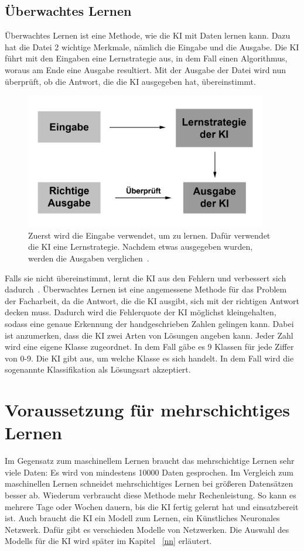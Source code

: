 \documentclass[11pt]{article}
\begin{document}
\subsection{Überwachtes Lernen}
Überwachtes Lernen ist eine Methode, wie die KI mit Daten lernen kann. Dazu hat die Datei 2 wichtige Merkmale, nämlich die Eingabe und die
Ausgabe. Die KI führt mit den Eingaben eine Lernstrategie aus, in dem Fall einen Algorithmus, woraus am Ende eine Ausgabe resultiert. Mit der Ausgabe der Datei wird nun überprüft, ob
die Antwort, die die KI ausgegeben hat, übereinstimmt.
\begin{figure}[h]
    \centering
    \includegraphics[width=300pt, keepaspectratio]{images/slearning}
    \caption[Ablauf eines überwachtes Lernen~\cite{7}]{Zuerst wird die Eingabe verwendet, um zu lernen. Dafür verwendet die KI eine Lernstrategie. Nachdem etwas
    ausgegeben wurden, werden die Ausgaben verglichen~\cite{7}.}
\end{figure}
Falls sie nicht übereinstimmt, lernt die KI aus den Fehlern und verbessert sich
dadurch~\cite{7}. Überwachtes Lernen ist eine angemessene Methode für das Problem der Facharbeit, da die Antwort, die die KI ausgibt, sich mit der richtigen Antwort decken muss.
Dadurch wird die Fehlerquote der KI möglichst kleingehalten, sodass eine genaue Erkennung der handgeschrieben Zahlen gelingen kann.
Dabei ist anzumerken, dass die KI zwei Arten von Lösungen angeben kann.
Jeder Zahl wird eine eigene Klasse zugeordnet. In dem Fall gäbe es 9 Klassen für jede Ziffer von 0-9.
Die KI gibt aus, um welche Klasse es sich handelt.
In dem Fall wird die sogenannte Klassifikation als Lösungsart akzeptiert.

\section{Voraussetzung für mehrschichtiges Lernen}
Im Gegensatz zum maschinellem Lernen braucht das mehrschichtige Lernen sehr viele Daten: Es wird von mindestens 10000 Daten gesprochen.
Im Vergleich zum maschinellen Lernen schneidet mehrschichtiges Lernen bei größeren Datensätzen besser ab. Wiederum verbraucht diese Methode mehr
Rechenleistung. So kann es mehrere Tage oder Wochen dauern, bis die KI fertig gelernt hat und einsatzbereit ist. Auch braucht die KI ein Modell zum
Lernen, ein Künstliches Neuronales Netzwerk. Dafür gibt es verschieden Modelle von Netzwerken. Die Auswahl des Modells für die KI wird später im Kapitel
~\ref{nn} erläutert.
\end{document}
